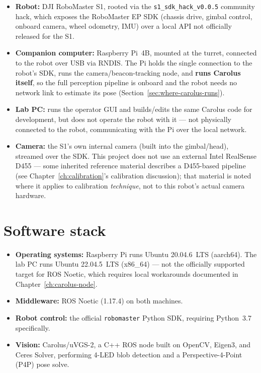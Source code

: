 \documentclass[11pt]{report}
\begin{document}
\begin{itemize}
  \item \textbf{Robot:} DJI RoboMaster S1, rooted via the
  \texttt{s1\_sdk\_hack\_v0.0.5} community hack, which exposes the
  RoboMaster EP SDK (chassis drive, gimbal control, onboard camera, wheel
  odometry, IMU) over a local API not officially released for the S1.
  \item \textbf{Companion computer:} Raspberry Pi~4B, mounted at the turret,
  connected to the robot over USB via RNDIS. The Pi holds the single
  connection to the robot's SDK, runs the camera/beacon-tracking node, and
  \textbf{runs Carolus itself}, so the full perception pipeline is onboard
  and the robot needs no network link to estimate its pose
  (Section~\ref{sec:where-carolus-runs}).
  \item \textbf{Lab PC:} runs the operator GUI and builds/edits the same
  Carolus code for development, but does not operate the robot with it ---
  not physically connected to the robot, communicating with the Pi over the
  local network.
  \item \textbf{Camera:} the S1's own internal camera (built into the
  gimbal/head), streamed over the SDK. This project does not use an external
  Intel RealSense D455 --- some inherited reference material describes a
  D455-based pipeline (see Chapter~\ref{ch:calibration}'s calibration
  discussion); that material is noted where it applies to calibration
  \emph{technique}, not to this robot's actual camera hardware.
\end{itemize}

\section{Software stack}

\begin{itemize}
  \item \textbf{Operating systems:} Raspberry Pi runs Ubuntu 20.04.6~LTS
  (aarch64). The lab PC runs Ubuntu 22.04.5~LTS (x86\_64) --- not the
  officially supported target for ROS Noetic, which requires local
  workarounds documented in Chapter~\ref{ch:carolus-node}.
  \item \textbf{Middleware:} ROS Noetic (1.17.4) on both machines.
  \item \textbf{Robot control:} the official \texttt{robomaster} Python SDK,
  requiring Python~3.7 specifically.
  \item \textbf{Vision:} Carolus/uVGS-2, a C++ ROS node built on OpenCV,
  Eigen3, and Ceres Solver, performing 4-LED blob detection and a
  Perspective-4-Point (P4P) pose solve.
\end{itemize}
\end{document}
